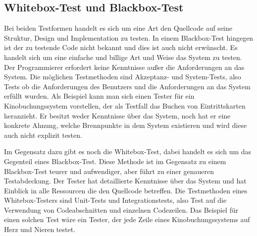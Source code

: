 \subsection{Whitebox-Test und Blackbox-Test}
Bei beiden Testformen handelt es sich um eine Art den Quellcode auf seine Struktur, Design und Implementation zu testen. 
In einem Blackbox-Test hingegen ist der zu testende Code nicht bekannt und dies ist auch nicht erwünscht. 
Es handelt sich um eine einfache und billige Art und Weise das System zu testen. 
Der Programmierer erfordert keine Kenntnisse außer die Anforderungen an das System. Die möglichen Testmethoden sind Akzeptanz- und System-Tests, also Tests ob die Anforderungen des Benutzers und die Anforderungen an das System erfüllt wurden.  
Als Beispiel kann man sich einen Tester für ein Kinobuchungssystem vorstellen, der als Testfall das Buchen von Eintrittskarten heranzieht. 
Er besitzt weder Kenntnisse über das System, noch hat er eine konkrete Ahnung, welche Brennpunkte in dem System existieren und wird diese auch nicht explizit testen. 

Im Gegensatz dazu gibt es noch die Whitebox-Test, dabei handelt es sich um das Gegenteil eines Blackbox-Test.
Diese Methode ist im Gegensatz zu einem Blackbox-Test teurer und aufwendiger, aber führt zu einer genaueren Testabdeckung.
Der Tester hat detaillierte Kenntnisse über das System und hat Einblick in alle Ressourcen die den Quellcode betreffen.  
Die Testmethoden eines Whitebox-Testers sind Unit-Tests und Integrationstests, also Test auf die Verwendung von Codeabschnitten und einzelnen Codezeilen.
Das Beispiel für einen solchen Test wäre ein Tester, der jede Zeile eines Kinobuchungssystems auf Herz und Nieren testet. 